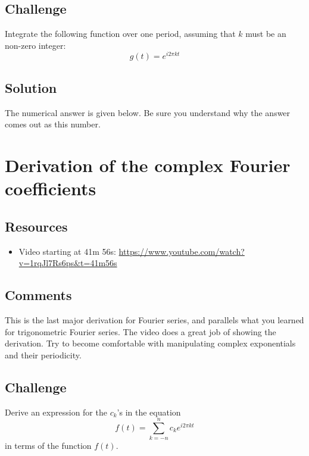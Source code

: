 \subsection*{Challenge}
Integrate the following function over one period, assuming that $k$ must be an non-zero integer:
\begin{equation}
    g(t) = e^{i 2 \pi k t}
\end{equation}

\subsection*{Solution}
The numerical answer is given below. Be sure you understand why the answer comes out as this number.





\newpage
\section{Derivation of the complex Fourier coefficients}

\subsection*{Resources}
\begin{itemize}
    \item Video starting at 41m 56s: \url{https://www.youtube.com/watch?v=1rqJl7Rs6ps&t=41m56s}
\end{itemize}

\subsection*{Comments}
This is the last major derivation for Fourier series, and parallels what you learned for trigonometric Fourier series. The video does a great job of showing the derivation. Try to become comfortable with manipulating complex exponentials and their periodicity.

\subsection*{Challenge}
Derive an expression for the $c_k$'s in the equation
\begin{equation}
    f(t) = \sum_{k=-n}^{n} c_k e^{i 2 \pi k t}
\end{equation}
in terms of the function $f(t)$.

